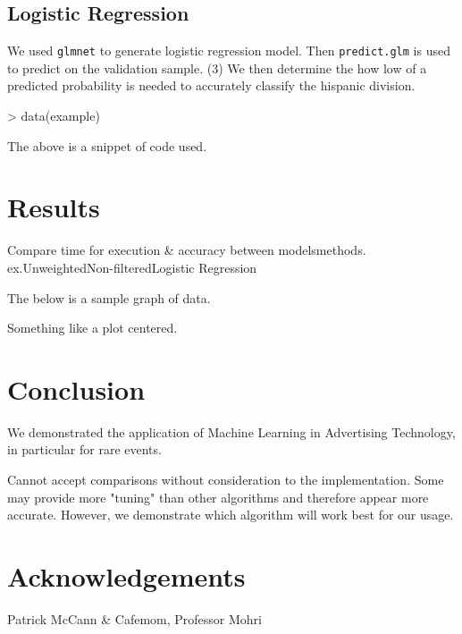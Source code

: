 \documentclass[a4paper]{article}
\begin{document}
\begin{multicols}{2}
\subsection*{Logistic Regression}
We used \texttt{glmnet} to generate logistic regression model.
Then \texttt{predict.glm} is used to predict on the validation sample.
(3) We then determine the how low of a predicted probability is needed to accurately classify the hispanic division.

\begin{Schunk}
\begin{Sinput}
> data(example)
\end{Sinput}
\end{Schunk}
The above is a snippet of code used. 

\section*{Results}
Compare time for execution \& accuracy between models\/methods. ex.Unweighted\/Non-filtered\/Logistic Regression

The below is a sample graph of data.
\begin{center}
Something like a plot centered.
\end{center}

\section*{Conclusion}
We demonstrated the application of Machine Learning in Advertising Technology, in particular for rare events.

Cannot accept comparisons without consideration to the implementation. Some may provide more "tuning" than other algorithms and therefore appear more accurate. However, we demonstrate which algorithm will work best for our usage.

\section*{Acknowledgements}
Patrick McCann \& Cafemom, Professor Mohri

\end{multicols}
\end{document}
